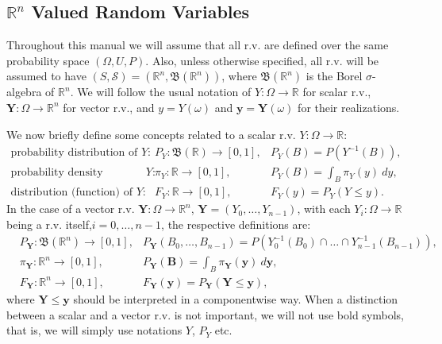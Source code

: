 \subsection{$\mathbb{R}^n$ Valued Random Variables}

Throughout this manual we will assume that all r.v. are defined over the same probability space $(\Omega,U,P)$.
Also, unless otherwise specified, all r.v. will be assumed to have
$(S,\mathcal{S})=(\mathbb{R}^n,\mathfrak{B}(\mathbb{R}^n))$,
where $\mathfrak{B}(\mathbb{R}^n)$ is the Borel $\sigma$-algebra of $\mathbb{R}^n$.
We will follow the usual notation of
$Y:\Omega\rightarrow\mathbb{R}$ for scalar r.v.,
$\mathbf{Y}:\Omega\rightarrow\mathbb{R}^n$ for vector r.v.,
and $y=Y(\omega)$ and $\mathbf{y}=\mathbf{Y}(\omega)$ for their realizations.

We now briefly define some concepts related to a scalar r.v. $Y:\Omega\rightarrow\mathbb{R}$:
\begin{eqnarray*}
\mbox{probability distribution of }                      Y: & P_Y:  \mathfrak{B}(\mathbb{R})\rightarrow [0,1], & P_Y(B) = P(Y^{-1}(B)),       \\
\mbox{probability density (function), if it exists, of } Y: & \pi_Y:             \mathbb{R} \rightarrow [0,1], & P_Y(B) = \int_B \pi_Y(y)~dy, \\
\mbox{distribution (function) of }                       Y: & F_Y:               \mathbb{R} \rightarrow [0,1], & F_Y(y) = P_Y(Y\leqslant y).
\end{eqnarray*}
In the case of a vector r.v. $\mathbf{Y}:\Omega\rightarrow\mathbb{R}^n$, $\mathbf{Y}=(Y_0,\ldots,Y_{n-1})$,
with each $Y_i:\Omega\rightarrow\mathbb{R}$ being a r.v. itself,$i=0,\ldots,n-1$, the respective definitions are:
\begin{eqnarray*}
 & P_{\mathbf{Y}}:  \mathfrak{B}(\mathbb{R}^n)\rightarrow [0,1], & P_{\mathbf{Y}}(B_0,\ldots,B_{n-1}) = P(Y_0^{-1}(B_0)\cap\ldots\cap Y_{n-1}^{-1}(B_{n-1})), \\
 & \pi_{\mathbf{Y}}:             \mathbb{R}^n \rightarrow [0,1], & P_{\mathbf{Y}}(\mathbf{B}) = \int_B \pi_{\mathbf{Y}}(\mathbf{y})~d\mathbf{y}, \\
 & F_{\mathbf{Y}}:               \mathbb{R}^n \rightarrow [0,1], & F_{\mathbf{Y}}(\mathbf{y}) = P_{\mathbf{Y}}(\mathbf{Y}\leqslant\mathbf{y}),
\end{eqnarray*}
where $\mathbf{Y}\leqslant\mathbf{y}$ should be interpreted in a componentwise way.
When a distinction between a scalar and a vector r.v. is not important, we will not use bold symbols, that is, we will simply use notations $Y$, $P_Y$ etc.

